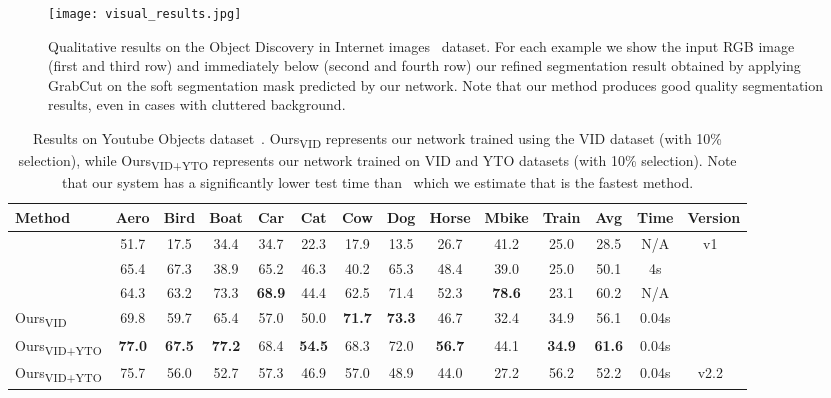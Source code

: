 \documentclass[10pt,twocolumn,letterpaper]{article}
\begin{document}
\begin{figure*}
\begin{center}
   \texttt{[image: visual\_results.jpg]}
\end{center}
   \caption{Qualitative results on the Object Discovery in Internet images~\cite{rubinstein2013unsupervised} dataset. For each example we show the input RGB image (first and third row) and immediately below (second and fourth row) our refined segmentation result obtained by applying GrabCut on the soft segmentation mask predicted by our network. Note that our method produces good quality segmentation results, even in cases with cluttered background.}
\label{fig:visual}
\end{figure*}

\begin{table*}
\begin{center}
\begin{tabular}{|l|*{10}{c|}|c|c|c|}
\hline
Method & Aero & Bird & Boat & Car & Cat & Cow & Dog & Horse & Mbike & Train & Avg & Time & Version \\
\hline\hline
~\cite{prest2012learning} & 51.7 & 17.5 & 34.4 & 34.7 & 22.3 & 17.9 & 13.5 & 26.7 & 41.2 & 25.0 & 28.5 & N/A & \multirow{4}{*}{v1~\cite{prest2012learning}} \\
~\cite{papazoglou2013fast} & 65.4 & 67.3 & 38.9 & 65.2 & 46.3 & 40.2 & 65.3 & 48.4 & 39.0 & 25.0 & 50.1 & 4s & \\
~\cite{jun2016pod} & 64.3 & 63.2 & 73.3 & \textbf{68.9} & 44.4 & 62.5 & 71.4 & 52.3 & \textbf{78.6} & 23.1 & 60.2 & N/A & \\
\cline{1-13}
Ours\textsubscript{VID} & 69.8 & 59.7 & 65.4 & 57.0 & 50.0 & \textbf{71.7} & \textbf{73.3} & 46.7 & 32.4 & 34.9 & 56.1 & 0.04s & \\
Ours\textsubscript{VID+YTO} & \textbf{77.0} & \textbf{67.5} & \textbf{77.2} & 68.4 & \textbf{54.5} & 68.3 & 72.0 & \textbf{56.7} & 44.1 & \textbf{34.9} & \textbf{61.6} & 0.04s & \\
\hline
\hline
Ours\textsubscript{VID+YTO} & 75.7 & 56.0 & 52.7 & 57.3 & 46.9 & 57.0 & 48.9 & 44.0 & 27.2 & 56.2 & 52.2 & 0.04s & v2.2~\cite{kalogeiton2016analysing} \\
\hline
\end{tabular}
\end{center}
\caption{Results on Youtube Objects dataset~\cite{prest2012learning}. Ours\textsubscript{VID} represents our network trained using the VID dataset (with 10\% selection), while Ours\textsubscript{VID+YTO} represents our network trained on VID and YTO datasets (with 10\% selection). Note that our system has a significantly lower test time than~\cite{papazoglou2013fast} which we estimate that is the fastest method.}
\label{tab:yto}
\end{table*}
\end{document}
